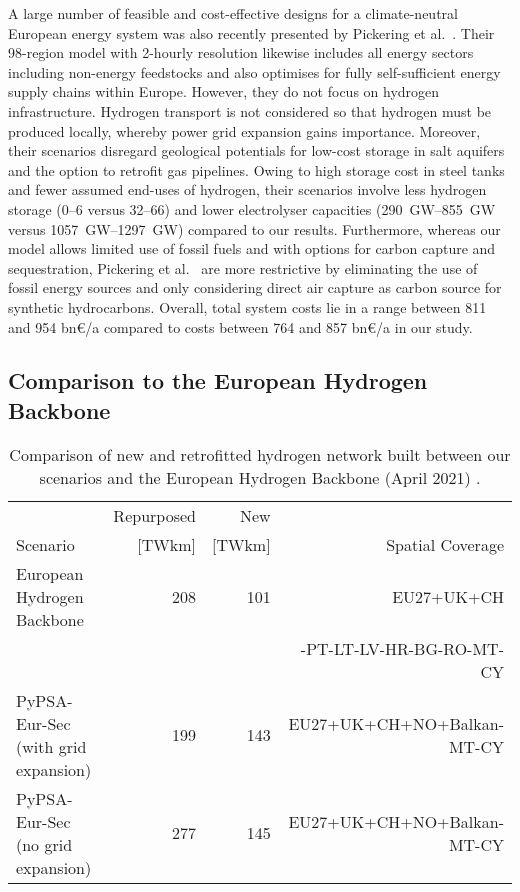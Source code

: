 A large number of feasible and cost-effective designs for a climate-neutral
European energy system was also recently presented by Pickering et
al.~\cite{pickeringDiversityOptions}. Their 98-region model with 2-hourly
resolution likewise includes all energy sectors including non-energy feedstocks
and also optimises for fully self-sufficient energy supply chains within Europe.
However, they do not focus on hydrogen infrastructure. Hydrogen transport is not
considered so that hydrogen must be produced locally, whereby power grid
expansion gains importance. Moreover, their scenarios disregard geological
potentials for low-cost storage in salt aquifers and the option to retrofit gas
pipelines. Owing to high storage cost in steel tanks and fewer assumed end-uses
of hydrogen, their scenarios involve less hydrogen storage (\SIrange{0}{6}{\twh}
versus \SIrange{32}{66}{\twh}) and lower electrolyser capacities
(\SIrange{290}{855}{\giga\watt} versus \SIrange{1057}{1297}{\giga\watt})
compared to our results. Furthermore, whereas our model allows limited use of
fossil fuels and with options for carbon capture and sequestration, Pickering et
al.~\cite{pickeringDiversityOptions} are more restrictive by eliminating the use
of fossil energy sources and only considering direct air capture as carbon
source for synthetic hydrocarbons. Overall, total system costs lie in a range between 811 and 954 bn\euro/a
compared to costs between 764 and 857 bn\euro/a in our study.


\subsection*{Comparison to the European Hydrogen Backbone}

\begin{table}
  \caption{Comparison of new and retrofitted hydrogen network built between our scenarios and the European Hydrogen Backbone (April 2021) \cite{gasforclimateExtendingEuropean2021}.}
  \label{tab:ehb}
  \centering
  \footnotesize
  \begin{tabular}{lrrr}
      \toprule
       & Repurposed & New &  \\
       Scenario& [TWkm] & [TWkm] & Spatial Coverage \\
      \midrule
      European Hydrogen Backbone \cite{gasforclimateExtendingEuropean2021} & 208 & 101 & EU27+UK+CH\\
      && & -PT-LT-LV-HR-BG-RO-MT-CY\\
      PyPSA-Eur-Sec (with grid expansion) & 199 & 143 & EU27+UK+CH+NO+Balkan-MT-CY \\
      PyPSA-Eur-Sec (no grid expansion) & 277 & 145 & EU27+UK+CH+NO+Balkan-MT-CY \\
      \bottomrule
    \end{tabular}
\end{table}

